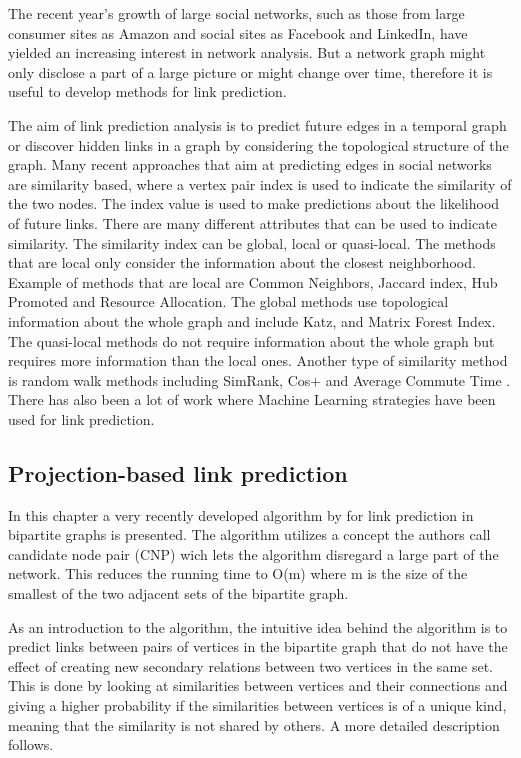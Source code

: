 The recent year's growth of large social networks, such as those from large consumer sites as Amazon and social sites as Facebook and LinkedIn, have yielded an increasing interest in network analysis. But a network graph might only disclose a part of a large picture or might change over time, therefore it is useful to develop methods for link prediction.

The aim of link prediction analysis is to predict future edges in a temporal graph or discover hidden links in a graph by considering the topological structure of the graph. Many recent approaches that aim at predicting edges in social networks are similarity based, where a vertex pair index is used to indicate the similarity of the two nodes. The index value is used to make predictions about the likelihood of future links. There are many different attributes that can be used to indicate similarity. The similarity index can be global, local or quasi-local. The methods that are local only consider the information about the closest neighborhood. Example of methods that are local are Common Neighbors, Jaccard index, Hub Promoted and Resource Allocation\cite{linkpredict}. The global methods use topological information about the whole graph and include Katz, and Matrix Forest Index\cite{linkpredict}. The quasi-local methods do not require information about the whole graph but requires more information than the local ones. Another type of similarity method is random walk methods including SimRank, Cos+ and Average Commute Time \cite{linkpredict}. There has also been a lot of work where Machine Learning strategies have been used for link prediction\cite{mlpredict1,mlpredict2,mlpredict3,mlpredict4,mlpredict5,mlpredict6,mlpredict7}.

\subsection{Projection-based link prediction}\label{sec:plp}
In this chapter a very recently developed algorithm by \citet{plp} for link prediction in bipartite graphs is presented. The algorithm utilizes a concept the authors call candidate node pair (CNP) wich lets the algorithm disregard a large part of the network. This reduces the running time to O(m) where m is the size of the smallest of the two adjacent sets of the bipartite graph.

As an introduction to the algorithm, the intuitive idea behind the algorithm is to predict links between pairs of vertices in the bipartite graph that do not have the effect of creating new secondary relations between two vertices in the same set. This is done by looking at similarities between vertices and their connections and giving a higher probability if the similarities between vertices is of a unique kind, meaning that the similarity is not shared by others. A more detailed description follows.

